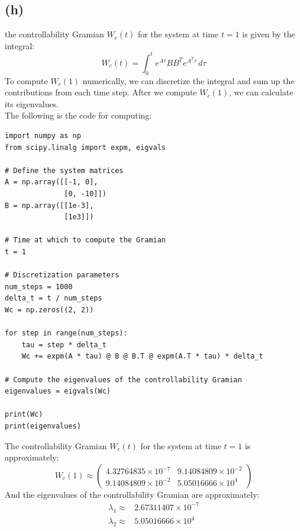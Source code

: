 \documentclass[12pt]{article}
\begin{document}
\subsection*{(h)}
the controllability Gramian $W_c(t)$ for the system at time $t=1$ is given by the integral:
\[
W_c(t) = \int_{0}^{t} e^{A\tau} BB^T e^{A^T\tau} \, d\tau
\]
To compute $W_c(1)$ numerically, we can discretize the integral and sum up the contributions from each time step. After we compute $W_c(1)$, we can calculate its eigenvalues.\\
The following is the code for computing:\\
\begin{verbatim}
import numpy as np
from scipy.linalg import expm, eigvals

# Define the system matrices
A = np.array([[-1, 0],
              [0, -10]])
B = np.array([[1e-3],
              [1e3]])

# Time at which to compute the Gramian
t = 1

# Discretization parameters
num_steps = 1000
delta_t = t / num_steps
Wc = np.zeros((2, 2))

for step in range(num_steps):
    tau = step * delta_t
    Wc += expm(A * tau) @ B @ B.T @ expm(A.T * tau) * delta_t

# Compute the eigenvalues of the controllability Gramian
eigenvalues = eigvals(Wc)

print(Wc)
print(eigenvalues)
\end{verbatim}
The controllability Gramian $W_c(t)$ for the system at time $t=1$ is approximately:
\[
W_c(1) \approx \begin{pmatrix}
4.32764835 \times 10^{-7} & 9.14084809 \times 10^{-2} \\
9.14084809 \times 10^{-2} & 5.05016666 \times 10^{4}
\end{pmatrix}
\]
And the eigenvalues of the controllability Gramian are approximately:
\[
\begin{split}
\lambda_1 \approx&2.67311407 \times 10^{-7} \\
\lambda_2 \approx&5.05016666 \times 10^4    
\end{split}
\]
\end{document}
